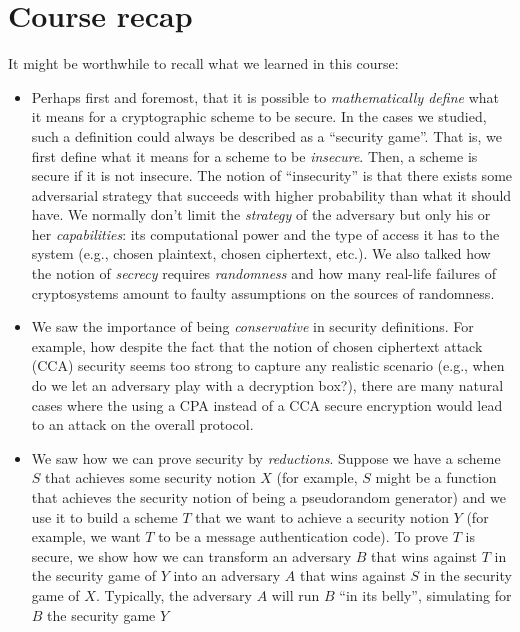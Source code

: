 \chapter{Course recap}\label{24-Course-recap}

It might be worthwhile to recall what we learned in this course:

\begin{itemize}
\item
  Perhaps first and foremost, that it is possible to
  \emph{mathematically define} what it means for a cryptographic scheme
  to be secure. In the cases we studied, such a definition could always
  be described as a ``security game''. That is, we first define what it
  means for a scheme to be \emph{insecure}. Then, a scheme is secure if
  it is not insecure. The notion of ``insecurity'' is that there exists
  some adversarial strategy that succeeds with higher probability than
  what it should have. We normally don't limit the \emph{strategy} of
  the adversary but only his or her \emph{capabilities}: its
  computational power and the type of access it has to the system (e.g.,
  chosen plaintext, chosen ciphertext, etc.). We also talked how the
  notion of \emph{secrecy} requires \emph{randomness} and how many
  real-life failures of cryptosystems amount to faulty assumptions on
  the sources of randomness.
\item
  We saw the importance of being \emph{conservative} in security
  definitions. For example, how despite the fact that the notion of
  chosen ciphertext attack (CCA) security seems too strong to capture
  any realistic scenario (e.g., when do we let an adversary play with a
  decryption box?), there are many natural cases where the using a CPA
  instead of a CCA secure encryption would lead to an attack on the
  overall protocol.
\item
  We saw how we can prove security by \emph{reductions}. Suppose we have
  a scheme \(S\) that achieves some security notion \(X\) (for example,
  \(S\) might be a function that achieves the security notion of being a
  pseudorandom generator) and we use it to build a scheme \(T\) that we
  want to achieve a security notion \(Y\) (for example, we want \(T\) to
  be a message authentication code). To prove \(T\) is secure, we show
  how we can transform an adversary \(B\) that wins against \(T\) in the
  security game of \(Y\) into an adversary \(A\) that wins against \(S\)
  in the security game of \(X\). Typically, the adversary \(A\) will run
  \(B\) ``in its belly'', simulating for \(B\) the security game \(Y\)

\end{itemize}
